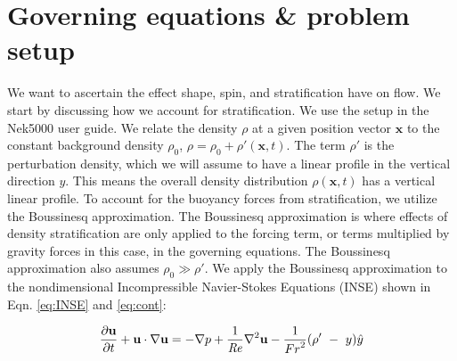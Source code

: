 \section{Governing equations {\&} problem setup}
\label{section:governing_equations_and_setup}
We want to ascertain the effect shape, spin, and stratification have on flow. We start by discussing how we account for stratification. We use the setup in the Nek5000 user guide\cite{fischer_nek5000_nodate}. We relate the density $\rho$ at a given position vector $\mathbf{x}$ to the constant background density $\rho_0$, $\rho = \rho_0 + \rho ' (\mathbf{x},t)$. The term $\rho'$ is the perturbation density, which we will assume to have a linear profile in the vertical direction $y$. This means the overall density distribution $\rho(\mathbf{x},t)$ has a vertical linear profile. To account for the buoyancy forces from stratification, we utilize the Boussinesq approximation. The Boussinesq approximation is where effects of density stratification are only applied to the forcing term, or terms multiplied by gravity forces in this case, in the governing equations. The Boussinesq approximation also assumes $\rho_0 \gg \rho '$.
We apply the Boussinesq approximation to the nondimensional Incompressible Navier-Stokes Equations (INSE) shown in Eqn. \ref{eq:INSE} and \ref{eq:cont}:

\begin{equation}
    \label{eq:INSE}
    \frac{\partial\mathbf{u}}{\partial t}+\mathbf{u}\cdot\nabla\mathbf{u}=-\nabla p+\frac{1}{\mathit{Re}}\nabla^2\mathbf{u}-\frac{1}{{Fr}^2} (\rho^\prime\ -\ y )\hat{y}
\end{equation}

